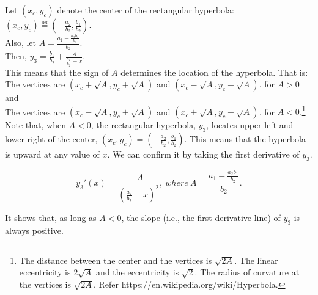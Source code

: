 \documentclass[11pt, a4paper]{article}
\begin{document}
\noindent
Let $(x_c, y_c)$ denote the center of the rectangular hyperbola: $(x_c, y_c) \overset{\underset{\mathrm{def}}{}}{=} (-\frac{a_2}{b_2}, \frac{b_1}{b_2})$.\\
\noindent
Also, let $A = \frac{a_1-\frac{a_2 b_1}{b_2}}{b_2}$. \\
Then, $y_3= \frac{b_1}{b_2}+\frac{A}{\frac{a_2}{b_2}+x}$.\\

\noindent
This means that the sign of $A$ determines the location of the hyperbola.
That is:\\
The vertices are $(x_c+\sqrt{A}, y_c+\sqrt{A})$ and $(x_c-\sqrt{A}, y_c-\sqrt{A})$. for $A>0$ and\\
The vertices are $(x_c-\sqrt{A}, y_c+\sqrt{A})$ and $(x_c+\sqrt{A}, y_c-\sqrt{A})$. for $A<0$.\footnote{The distance between the center and the vertices is $\sqrt{2A}$. The linear eccentricity is $2\sqrt{A}$ and the eccentricity is $\sqrt{2}$. The radius of curvature at the vertices is $\sqrt{2A}$. Refer https://en.wikipedia.org/wiki/Hyperbola.}\\

\noindent
Note that, when $A<0$, the rectangular hyperbola, $y_3$, locates upper-left and lower-right of the center, $(x_c, y_c) = (-\frac{a_2}{b_2}, \frac{b_1}{b_2})$. This means that the hyperbola is upward at any value of $x$. We can confirm it by  taking the first derivative of $y_3$. 

\noindent
\begin{equation}
\label{eq:deriv}
y_3'(x)=\frac{\mbox{-}A}{(\frac{a_2}{b_2}+x)^2},~where~A = \frac{a_1-\frac{a_2 b_1}{b_2}}{b_2}.
\end{equation}


\noindent
It shows that, as long as $A<0$, the slope (i.e., the first derivative line) of $y_3$ is always positive.\\

\end{document}
